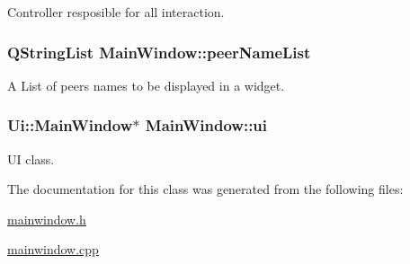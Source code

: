 \-Controller resposible for all interaction. 

\hypertarget{class_main_window_a8c245df1016600d0f111fb98c8738d6d}{
\subsubsection[{peer\-Name\-List}]{\setlength{\rightskip}{0pt plus 5cm}\-Q\-String\-List {\bf \-Main\-Window\-::peer\-Name\-List}}}
\label{class_main_window_a8c245df1016600d0f111fb98c8738d6d}


\-A \-List of peers names to be displayed in a widget. 

\hypertarget{class_main_window_a35466a70ed47252a0191168126a352a5}{
\subsubsection[{ui}]{\setlength{\rightskip}{0pt plus 5cm}\-Ui\-::\-Main\-Window$\ast$ {\bf \-Main\-Window\-::ui}}}
\label{class_main_window_a35466a70ed47252a0191168126a352a5}


\-U\-I class. 



\-The documentation for this class was generated from the following files\-:\begin{DoxyCompactItemize}
\item 
\hyperlink{mainwindow_8h}{mainwindow.\-h}\item 
\hyperlink{mainwindow_8cpp}{mainwindow.\-cpp}\end{DoxyCompactItemize}
